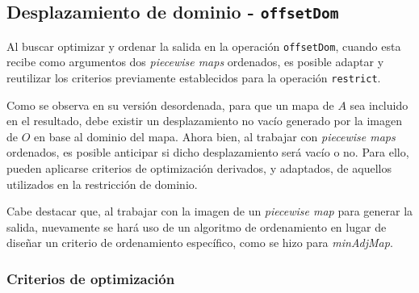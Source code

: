 \subsection{Desplazamiento de dominio - \texttt{offsetDom}}

Al buscar optimizar y ordenar la salida en la operación \texttt{offsetDom}, cuando esta recibe como argumentos dos \textit{piecewise maps} ordenados, es posible adaptar y reutilizar los criterios previamente establecidos para la operación \texttt{restrict}.

Como se observa en su versión desordenada, para que un mapa de $A$ sea incluido en el resultado, debe existir un desplazamiento no vacío generado por la imagen de $O$ en base al dominio del mapa. Ahora bien, al trabajar con \textit{piecewise maps} ordenados, es posible anticipar si dicho desplazamiento será vacío o no. Para ello, pueden aplicarse criterios de optimización derivados, y adaptados, de aquellos utilizados en la restricción de dominio.

Cabe destacar que, al trabajar con la imagen de un \textit{piecewise map} para generar la salida, 
nuevamente se hará uso de un algoritmo de ordenamiento en lugar de diseñar un criterio de ordenamiento específico, como se hizo para \textit{minAdjMap}.


\subsubsection{Criterios de optimización}


\begin{center}
\end{center}


